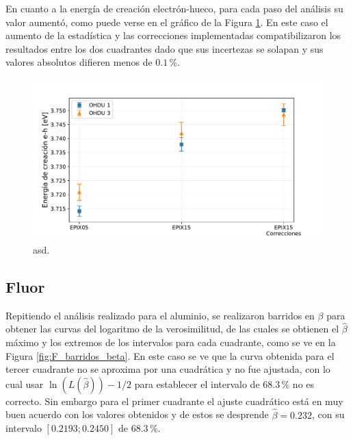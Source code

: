 En cuanto a la energía de creación electrón-hueco, para cada paso del análisis su valor aumentó, como puede verse en el gráfico de la Figura \ref{fig:Al_energia_creacion_eh}. En este caso el aumento de la estadística y las correcciones implementadas compatibilizaron los resultados entre los dos cuadrantes dado que sus incertezas se solapan y sus valores absolutos difieren menos de $0.1\,\%$.
\begin{figure}[h]
    \centering
        \includegraphics[scale=0.5]{Figs/Al_energia_creacion_eh.pdf}
    \caption{\footnotesize{asd.}}
    \label{fig:Al_energia_creacion_eh}
\end{figure}

\pagebreak
\subsection{Fluor}
\noindent Repitiendo el análisis realizado para el aluminio, se realizaron barridos en $\beta$ para obtener las curvas del logaritmo de la verosimilitud, de las cuales se obtienen el $\hat{\beta}$ máximo y los extremos de los intervalos para cada cuadrante, como se ve en la Figura \ref{fig:F_barridos_beta}.%
En este caso se ve que la curva obtenida para el tercer cuadrante no se aproxima por una cuadrática y no fue ajustada, con lo cual usar $\ln{(L(\hat{\beta}))} - 1/2$ para establecer el intervalo de $68.3\,\%$ no es correcto.%
Sin embargo para el primer cuadrante el ajuste cuadrático está en muy buen acuerdo con los valores obtenidos y de estos se desprende $\hat{\beta} = 0.232$, con su intervalo $[0.2193; 0.2450]$ de $68.3\,\%$.

